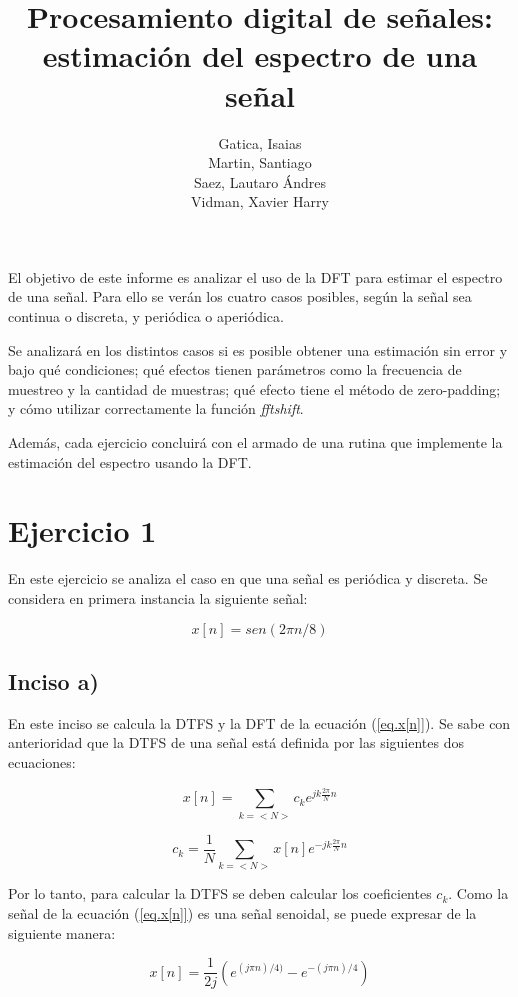 \documentclass{article}
\author{Gatica, Isaias \\ Martin, Santiago \\ Saez, Lautaro Ándres \\ Vidman, Xavier Harry}
\title{Procesamiento digital de señales: estimación del espectro de una señal}
\date{}
\begin{document}
\maketitle 
El objetivo de este informe es analizar el uso de la DFT para estimar el espectro de una señal. Para ello se verán los cuatro casos posibles, según la señal sea continua o discreta, y periódica o aperiódica.


Se analizará en los distintos casos si es posible obtener una estimación sin error y bajo qué condiciones; qué efectos tienen parámetros como la frecuencia de muestreo y la cantidad de muestras; qué efecto tiene el método de zero-padding; y cómo utilizar correctamente la función \textit{fftshift}.


Además, cada ejercicio concluirá con el armado de una rutina que implemente la estimación del espectro usando la DFT.


\section{Ejercicio 1}
En este ejercicio se analiza el caso en que una señal es periódica y discreta. Se considera en primera instancia la siguiente señal: 

\begin{equation}
x[n]=sen(2 \pi n /8)
\label{eq.x[n]}
\end{equation}

\subsection*{Inciso a)}
En este inciso se calcula la DTFS y la DFT de la ecuación (\ref{eq.x[n]}). Se sabe con anterioridad que la DTFS de una señal está definida por las siguientes dos ecuaciones:

\begin{equation}
x[n] = \sum_{k=<N>}^{} c_{k} e^{jk \frac{2 \pi}{N} n}
\end{equation}

\begin{equation}
c_{k} = \frac{1}{N} \sum_{k=<N>}^{} x[n] e^{-jk \frac{2 \pi}{N} n}
\end{equation}	

Por lo tanto, para calcular la DTFS se deben calcular los coeficientes $c_{k}$. Como la señal de la ecuación (\ref{eq.x[n]}) es una señal senoidal, se puede expresar de la siguiente manera:

\begin{equation}
x[n]= \frac{1}{2j} \left( e^{(j \pi n)/4)}-e^{-(j \pi n)/4} \right)
\end{equation}
\end{document}
